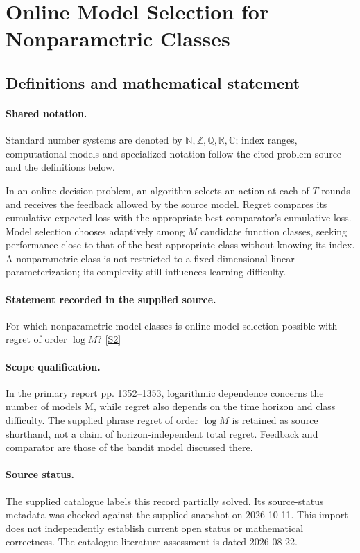 \documentclass[11pt]{article}
\newcommand{\sref}[2]{\hyperlink{source:#1:#2}{[S#2]}}
\begin{document}
\section{Online Model Selection for Nonparametric Classes}\label{statement}

\subsection{Definitions and mathematical statement}

\paragraph{Shared notation.}Standard number systems are denoted by $\mathbb N,\mathbb Z,\mathbb Q,\mathbb R,\mathbb C$; index ranges, computational models and specialized notation follow the cited problem source and the definitions below.


In an online decision problem, an algorithm selects an action at each of $T$ rounds and receives the feedback allowed by the source model. Regret compares its cumulative expected loss with the appropriate best comparator's cumulative loss. Model selection chooses adaptively among $M$ candidate function classes, seeking performance close to that of the best appropriate class without knowing its index. A nonparametric class is not restricted to a fixed-dimensional linear parameterization; its complexity still influences learning difficulty.
\paragraph{Statement recorded in the supplied source.}
For which nonparametric model classes is online model selection possible with regret of order $\log M$? \sref{statement}{2}
\paragraph{Scope qualification.}
In the primary report pp. 1352--1353, logarithmic dependence concerns the number of models M, while regret also depends on the time horizon and class difficulty. The supplied phrase regret of order $\log M$ is retained as source shorthand, not a claim of horizon-independent total regret. Feedback and comparator are those of the bandit model discussed there.
\paragraph{Source status.}
The supplied catalogue labels this record partially solved. Its source-status metadata was checked against the supplied snapshot on 2026-10-11. This import does not independently establish current open status or mathematical correctness. The catalogue literature assessment is dated 2026-08-22.
\end{document}
